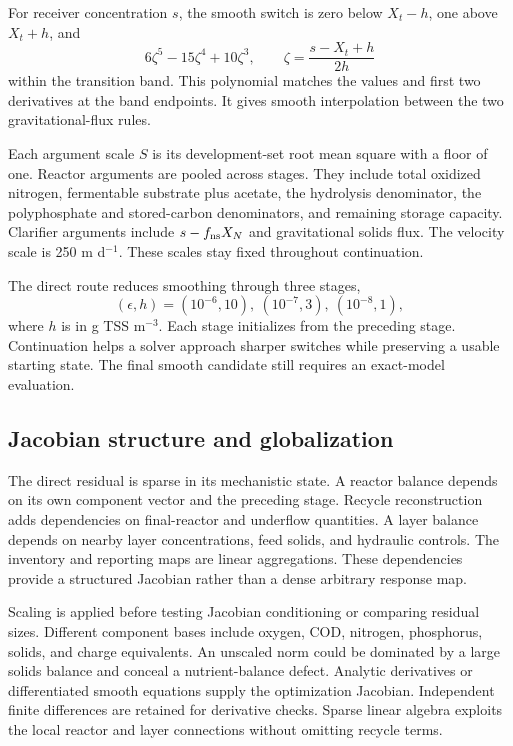 For receiver concentration $s$, the smooth switch is zero below $X_t-h$, one above $X_t+h$, and
\begin{equation}
6\zeta^5-15\zeta^4+10\zeta^3,\qquad
\zeta=\frac{s-X_t+h}{2h}
\label{eq:plant_receiver_switch}
\end{equation}
within the transition band. This polynomial matches the values and first two derivatives at the band endpoints. It gives smooth interpolation between the two gravitational-flux rules.

Each argument scale $S$ is its development-set root mean square with a floor of one. Reactor arguments are pooled across stages. They include total oxidized nitrogen, fermentable substrate plus acetate, the hydrolysis denominator, the polyphosphate and stored-carbon denominators, and remaining storage capacity. Clarifier arguments include $s-f_{\rm ns}X_N$ and gravitational solids flux. The velocity scale is 250 m d$^{-1}$. These scales stay fixed throughout continuation.

The direct route reduces smoothing through three stages,
\begin{equation}
(\epsilon,h)=(10^{-6},10),\ (10^{-7},3),\ (10^{-8},1),
\label{eq:plant_continuation_sequence}
\end{equation}
where $h$ is in g TSS m$^{-3}$. Each stage initializes from the preceding stage. Continuation helps a solver approach sharper switches while preserving a usable starting state. The final smooth candidate still requires an exact-model evaluation.

\subsection{Jacobian structure and globalization}

The direct residual is sparse in its mechanistic state. A reactor balance depends on its own component vector and the preceding stage. Recycle reconstruction adds dependencies on final-reactor and underflow quantities. A layer balance depends on nearby layer concentrations, feed solids, and hydraulic controls. The inventory and reporting maps are linear aggregations. These dependencies provide a structured Jacobian rather than a dense arbitrary response map.

Scaling is applied before testing Jacobian conditioning or comparing residual sizes. Different component bases include oxygen, COD, nitrogen, phosphorus, solids, and charge equivalents. An unscaled norm could be dominated by a large solids balance and conceal a nutrient-balance defect. Analytic derivatives or differentiated smooth equations supply the optimization Jacobian. Independent finite differences are retained for derivative checks. Sparse linear algebra exploits the local reactor and layer connections without omitting recycle terms.

